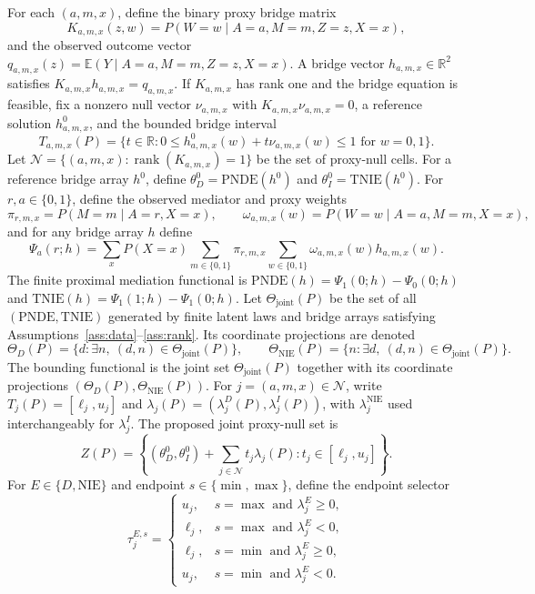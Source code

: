\documentclass[11pt]{article}
\newcommand{\E}{\mathbb{E}}
\newcommand{\R}{\mathbb{R}}
\theoremstyle{definition}
\theoremstyle{plain}
\theoremstyle{remark}
\begin{document}
For each \((a,m,x)\), define the binary proxy bridge matrix
\[
K_{a,m,x}(z,w)=P(W=w\mid A=a,M=m,Z=z,X=x),
\]
and the observed outcome vector \(q_{a,m,x}(z)=\E(Y\mid A=a,M=m,Z=z,X=x)\).  A bridge vector \(h_{a,m,x}\in\R^2\) satisfies \(K_{a,m,x}h_{a,m,x}=q_{a,m,x}\).  If \(K_{a,m,x}\) has rank one and the bridge equation is feasible, fix a nonzero null vector \(\nu_{a,m,x}\) with \(K_{a,m,x}\nu_{a,m,x}=0\), a reference solution \(h^0_{a,m,x}\), and the bounded bridge interval
\[
T_{a,m,x}(P)=\{t\in\R: 0\le h^0_{a,m,x}(w)+t\nu_{a,m,x}(w)\le 1\text{ for }w=0,1\}.
\]
Let \(\mathcal N=\{(a,m,x):\operatorname{rank}(K_{a,m,x})=1\}\) be the set of proxy-null cells.  For a reference bridge array \(h^0\), define \(\theta^0_D=\mathrm{PNDE}(h^0)\) and \(\theta^0_I=\mathrm{TNIE}(h^0)\).
For \(r,a\in\{0,1\}\), define the observed mediator and proxy weights
\[
\pi_{r,m,x}=P(M=m\mid A=r,X=x),\qquad
\omega_{a,m,x}(w)=P(W=w\mid A=a,M=m,X=x),
\]
and for any bridge array \(h\) define
\[
\Psi_a(r;h)=\sum_x P(X=x)\sum_{m\in\{0,1\}}\pi_{r,m,x}
\sum_{w\in\{0,1\}}\omega_{a,m,x}(w)h_{a,m,x}(w).
\]
The finite proximal mediation functional is
\(\mathrm{PNDE}(h)=\Psi_1(0;h)-\Psi_0(0;h)\) and
\(\mathrm{TNIE}(h)=\Psi_1(1;h)-\Psi_1(0;h)\).  Let \(\Theta_{\mathrm{joint}}(P)\) be the set of all \((\mathrm{PNDE},\mathrm{TNIE})\) generated by finite latent laws and bridge arrays satisfying Assumptions~\ref{ass:data}--\ref{ass:rank}.  Its coordinate projections are denoted
\[
\Theta_D(P)=\{d:\exists n,\ (d,n)\in\Theta_{\mathrm{joint}}(P)\},\qquad
\Theta_{\mathrm{NIE}}(P)=\{n:\exists d,\ (d,n)\in\Theta_{\mathrm{joint}}(P)\}.
\]
The bounding functional is the joint set \(\Theta_{\mathrm{joint}}(P)\) together with its coordinate projections \((\Theta_D(P),\Theta_{\mathrm{NIE}}(P))\).
For \(j=(a,m,x)\in\mathcal N\), write \(T_j(P)=[\ell_j,u_j]\) and \(\lambda_j(P)=(\lambda^D_j(P),\lambda^I_j(P))\), with \(\lambda^{\mathrm{NIE}}_j\) used interchangeably for \(\lambda^I_j\).  The proposed joint proxy-null set is
\[
Z(P)=\left\{(\theta^0_D,\theta^0_I)+\sum_{j\in\mathcal N}t_j\lambda_j(P):t_j\in[\ell_j,u_j]\right\}.
\]
For \(E\in\{D,\mathrm{NIE}\}\) and endpoint \(s\in\{\min,\max\}\), define the endpoint selector
\[
\tau^{E,s}_j=
\begin{cases}
u_j,& s=\max\text{ and }\lambda^E_j\ge0,\\
\ell_j,& s=\max\text{ and }\lambda^E_j<0,\\
\ell_j,& s=\min\text{ and }\lambda^E_j\ge0,\\
u_j,& s=\min\text{ and }\lambda^E_j<0.
\end{cases}
\]
\end{document}

